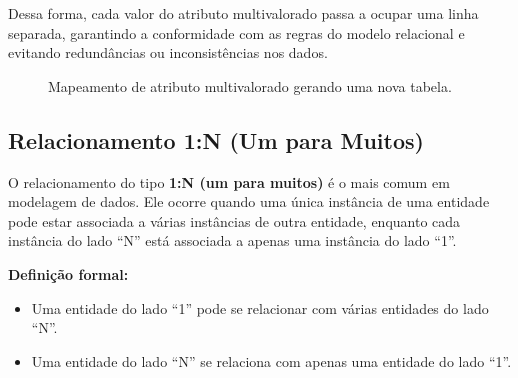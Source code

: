 Dessa forma, cada valor do atributo multivalorado passa a ocupar uma linha separada, garantindo a conformidade com as regras do modelo relacional e evitando redundâncias ou inconsistências nos dados.
\begin{figure}[H]
    \centering
    \caption{Mapeamento de atributo multivalorado gerando uma nova tabela.}
\end{figure}
\subsection{Relacionamento 1:N (Um para Muitos)}

O relacionamento do tipo \textbf{1:N (um para muitos)} é o mais comum em modelagem de dados. Ele ocorre quando uma única instância de uma entidade pode estar associada a várias instâncias de outra entidade, enquanto cada instância do lado ``N'' está associada a apenas uma instância do lado ``1''.

\bigskip

\textbf{Definição formal:}
\begin{itemize}
    \item Uma entidade do lado ``1'' pode se relacionar com várias entidades do lado ``N''.
    \item Uma entidade do lado ``N'' se relaciona com apenas uma entidade do lado ``1''.
\end{itemize}

\bigskip


